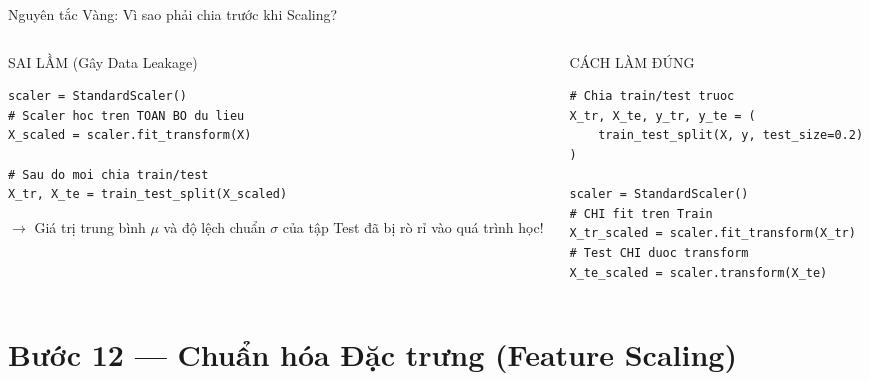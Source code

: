 \documentclass[aspectratio=169,11pt]{beamer}
\begin{document}
\begin{frame}[fragile]{Nguyên tắc Vàng: Vì sao phải chia trước khi Scaling?}
\begin{columns}[T]
\begin{column}{0.48\textwidth}
\begin{alertblock}{SAI LẦM (Gây Data Leakage)}
\begin{lstlisting}[style=pythonstyle]
scaler = StandardScaler()
# Scaler hoc tren TOAN BO du lieu
X_scaled = scaler.fit_transform(X)

# Sau do moi chia train/test
X_tr, X_te = train_test_split(X_scaled)
\end{lstlisting}
$\rightarrow$ Giá trị trung bình $\mu$ và độ lệch chuẩn $\sigma$ của tập Test đã bị rò rỉ vào quá trình học!
\end{alertblock}
\end{column}
\begin{column}{0.48\textwidth}
\begin{block}{CÁCH LÀM ĐÚNG}
\begin{lstlisting}[style=pythonstyle]
# Chia train/test truoc
X_tr, X_te, y_tr, y_te = (
    train_test_split(X, y, test_size=0.2)
)

scaler = StandardScaler()
# CHI fit tren Train
X_tr_scaled = scaler.fit_transform(X_tr)
# Test CHI duoc transform
X_te_scaled = scaler.transform(X_te)
\end{lstlisting}
\end{block}
\end{column}
\end{columns}
\end{frame}

\section{Bước 12 — Chuẩn hóa Đặc trưng (Feature Scaling)}
\end{document}
